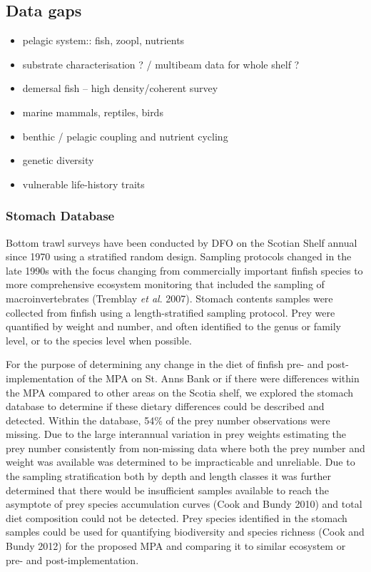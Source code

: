 \documentclass[letterpaper,portrait,11pt]{scrartcl}
\numberwithin{equation}{section}		%
\numberwithin{figure}{section}		%
\numberwithin{table}{section}				%
\begin{document}
\subsection{Data gaps}
\begin{itemize}
  \item pelagic system:: fish, zoopl, nutrients 
  \item substrate characterisation ?  / multibeam data for whole shelf ?
  \item demersal fish -- high density/coherent survey
  \item marine mammals, reptiles, birds
  \item benthic / pelagic coupling and nutrient cycling
  \item genetic diversity 
  \item vulnerable life-history traits
  
\end{itemize}	

\subsubsection{Stomach Database}

Bottom trawl surveys have been conducted by DFO on the Scotian Shelf annual since 1970 using a stratified random design.  Sampling protocols changed in the late 1990s with the focus changing from commercially important finfish species to more comprehensive ecosystem monitoring that included the sampling of macroinvertebrates (Tremblay \textit{et al}. 2007).  Stomach contents samples were collected from finfish using a length-stratified sampling protocol.  Prey were quantified by weight and number, and often identified to the genus or family level, or to the species level when possible.  

For the purpose of determining any change in the diet of finfish pre- and post- implementation of the MPA on St. Anns Bank or if there were differences within the MPA compared to other areas on the Scotia shelf, we explored the stomach database to determine if these dietary differences could be described and detected. Within the database, 54\% of the prey number observations were missing.  Due to the large interannual variation in prey weights estimating the prey number consistently from non-missing data where both the prey number and weight was available was determined to be impracticable and unreliable.  Due to the sampling stratification both by depth and length classes it was further determined that there would be insufficient samples available to reach the asymptote of prey species accumulation curves (Cook and Bundy 2010) and total diet composition could not be detected.  Prey species identified in the stomach samples could be used for quantifying biodiversity and species richness (Cook and Bundy 2012) for the proposed MPA and comparing it to similar ecosystem or pre- and post-implementation.
\end{document}
